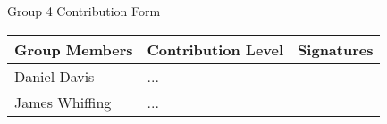 
\thispagestyle{empty} %

\vspace{0.25\textheight}
\begin{center}
    \LARGE Group 4 Contribution Form\\
    \Large
    \vspace{0.05\textheight}
    \begin{tabular}[0.9\textwidth]{@{}|m{}|m{}|m{}|@{}}
        \hline
        \textbf{Group Members} & \textbf{Contribution Level} & \textbf{Signatures} \\
        \hline
        Daniel Davis & ... & \\
        \hline
        James Whiffing & ... & \\
        \hline
    \end{tabular}
\end{center}
\clearpage
{}
\newpage

\title{}
\renewcommand\maketitlehookb{\centering \Large CM50265 - Coursework 2 - Group Report}
\date{\today}
\author{
    Davis, Daniel\\
    Department of Computer Science\\
    University of Bath\\
    Bath, BA2 7AY \\
    \textit{...@bath.ac.uk} \\
    \and
    Whiffing, James\\
    Department of Computer Science\\
    University of Bath\\
    Bath, BA2 7AY \\
    \textit{jw2304@bath.ac.uk} \\
}

\maketitle

\clearpage
\restoregeometry
\newpage

\setcounter{page}{0}
\pagestyle{fancy}


\tableofcontents
\clearpage
\newpage
{}
\listoffigures
\clearpage
\newpage
{}
\listoftables
\clearpage
\newpage


\setcounter{page}{1}
